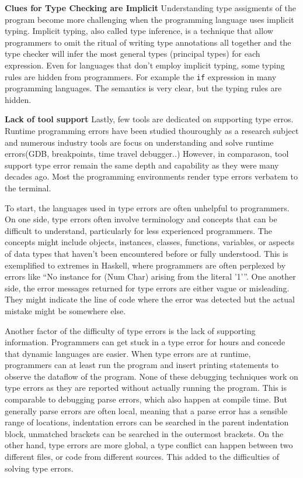 \textbf{Clues for Type Checking are Implicit}
Understanding type assigments of the program become more challenging when the programming language uses implicit typing. Implicit typing, also called type inference, is a technique that allow programmers to omit the ritual of writing type annotations all together and the type checker will infer the most general types (principal types) for each expression. Even for languages that don't employ implicit typing, some typing rules are hidden from programmers.
For example the \texttt{if} expression in many programming languages. The semantics is very clear, but the typing rules are hidden.


\textbf{Lack of tool support}
Lastly, few tools are dedicated on supporting type erros. Runtime programming errors have been studied thouroughly as a research subject and numerous industry tools are focus on understanding and solve runtime errors(GDB, breakpoints, time travel debugger..)  However, in comparason, tool support type error  remain the same depth and capability as they were many decades ago. Most the programming environments render type errors verbatem to the terminal.   


To start, the languages used in type errors are often unhelpful to programmers. On one side, type errors often involve terminology and concepts that can be difficult to understand, particularly for less experienced programmers. The concepts might include objects, instances, classes, functions, variables, or aspects of data types that haven't been encountered before or fully understood. This is exemplified to extremes in Haskell, where programmers are often perplexed by errors like “No instance for (Num Char) arising from the literal '1'”. One another side,  the error messages returned for type errors are either vague or misleading. They might indicate the line of code where the error was detected but the actual mistake might be somewhere else.


Another factor of the difficulty of type errors is the lack of supporting information. Programmers can get stuck in a type error for hours and concede that dynamic languages are easier. When type errors are at runtime, programmers can at least run the program and insert printing statements to observe the dataflow of the program. None of these debugging techniques work on type errors as they are reported without actually running the program.  This is  comparable to debugging parse errors, which also happen at compile time. But generally parse errors are often local, meaning that a parse error has a sensible range of locations,  indentation errors can be searched in the parent indentation block, unmatched brackets can be searched in the outermost brackets. On the other hand, type errors are more global, a type conflict can happen between two different files, or code from different sources. This added to the difficulties of solving type errors.
 

